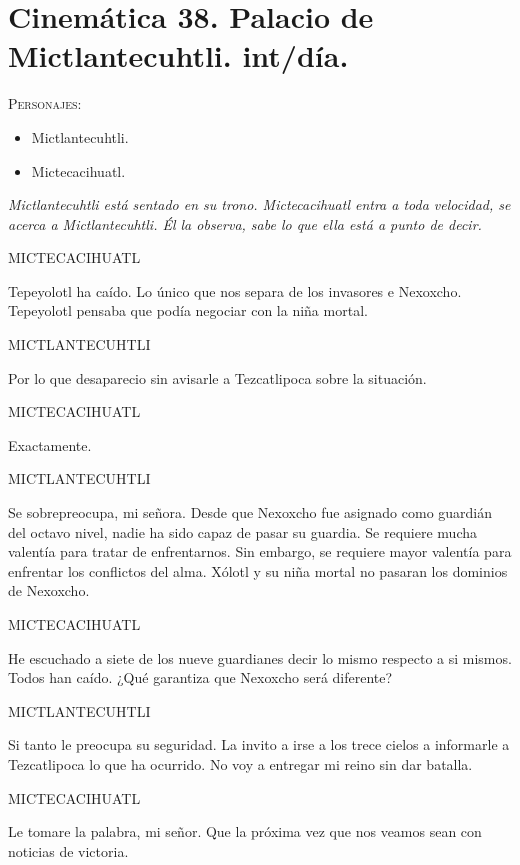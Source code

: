 \documentclass[11pt,letterpaper]{article}
\begin{document}
\section{Cinemática 38. Palacio de Mictlantecuhtli. int/día.}
 \textsc{Personajes}:
 \begin{itemize}
 \item Mictlantecuhtli.
 \item Mictecacihuatl.

 \end{itemize}
\textit{Mictlantecuhtli está sentado en su trono. Mictecacihuatl entra a toda velocidad, se acerca a Mictlantecuhtli. Él la observa, sabe lo que ella está a punto de decir.}
\begin{center}
MICTECACIHUATL
\\
\par
Tepeyolotl ha caído. Lo único que nos separa de los invasores e Nexoxcho. Tepeyolotl pensaba que podía negociar con la niña mortal.
\\
\par
MICTLANTECUHTLI
\\
\par
Por lo que desaparecio sin avisarle a Tezcatlipoca sobre la situación. 
\\
\par
MICTECACIHUATL
\\
\par
Exactamente.
\\
\par
MICTLANTECUHTLI
\\
\par
Se sobrepreocupa, mi señora. Desde que Nexoxcho fue asignado como guardián del octavo nivel, nadie ha sido capaz de pasar su guardia. Se requiere mucha valentía para tratar de enfrentarnos. Sin embargo, se requiere mayor valentía para enfrentar los conflictos del alma. Xólotl y su niña mortal no pasaran los dominios de Nexoxcho.
\\
\par
MICTECACIHUATL
\\
\par
He escuchado a siete de los nueve guardianes decir lo mismo respecto a si mismos. Todos han caído. ¿Qué garantiza que Nexoxcho será diferente?
\\
\par
MICTLANTECUHTLI
\\
\par
Si tanto le preocupa su seguridad. La invito a irse a los trece cielos a informarle a Tezcatlipoca lo que ha ocurrido. No voy a entregar mi reino sin dar batalla.
\\
\par
MICTECACIHUATL
\\
\par
Le tomare la palabra, mi señor. Que la próxima vez que nos veamos sean con noticias de victoria.
\end{center}
\end{document}
